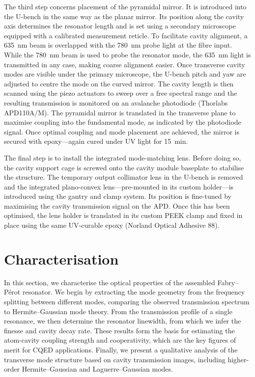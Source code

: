 \documentclass[../Thesis-IJspeert.tex]{subfiles}
\begin{document}
The third step concerns placement of the pyramidal mirror. It is introduced into the U-bench in the same way as the planar mirror. Its position along the cavity axis determines the resonator length and is set using a secondary microscope equipped with a calibrated measurement reticle. To facilitate cavity alignment, a \SI{635}{\nano\meter} beam is overlapped with the \SI{780}{\nano\meter} probe light at the fibre input. While the \SI{780}{\nano\meter} beam is used to probe the resonator mode, the \SI{635}{\nano\meter} light is transmitted in any case, making coarse alignment easier. Once transverse cavity modes are visible under the primary microscope, the U-bench pitch and yaw are adjusted to centre the mode on the curved mirror. The cavity length is then scanned using the piezo actuators to sweep over a free spectral range and the resulting transmission is monitored on an avalanche photodiode (Thorlabs APD110A/M). The pyramidal mirror is translated in the transverse plane to maximise coupling into the fundamental mode, as indicated by the photodiode signal. Once optimal coupling and mode placement are achieved, the mirror is secured with epoxy---again cured under UV light for \SI{15}{\minute}.

The final step is to install the integrated mode-matching lens. Before doing so, the cavity support cage is screwed onto the cavity module baseplate to stabilise the structure. The temporary output collimator lens in the U-bench is removed and the integrated plano-convex lens---pre-mounted in its custom holder---is introduced using the gantry and clamp system. Its position is fine-tuned by maximising the cavity transmission signal on the APD. Once this has been optimised, the lens holder is translated in its custom PEEK clamp and fixed in place using the same UV-curable epoxy (Norland Optical Adhesive 88).

\section{Characterisation}
\label{sec:characterisation}
In this section, we characterise the optical properties of the assembled Fabry--Pérot resonator. We begin by extracting the mode geometry from the frequency splitting between different modes, comparing the observed transmission spectrum to Hermite--Gaussian mode theory. From the transmission profile of a single resonance, we then determine the resonator linewidth, from which we infer the finesse and cavity decay rate. These results form the basis for estimating the atom-cavity coupling strength and cooperativity, which are the key figures of merit for CQED applications. Finally, we present a qualitative analysis of the transverse mode structure based on cavity transmission images, including higher-order Hermite--Gaussian and Laguerre--Gaussian modes.
\end{document}
